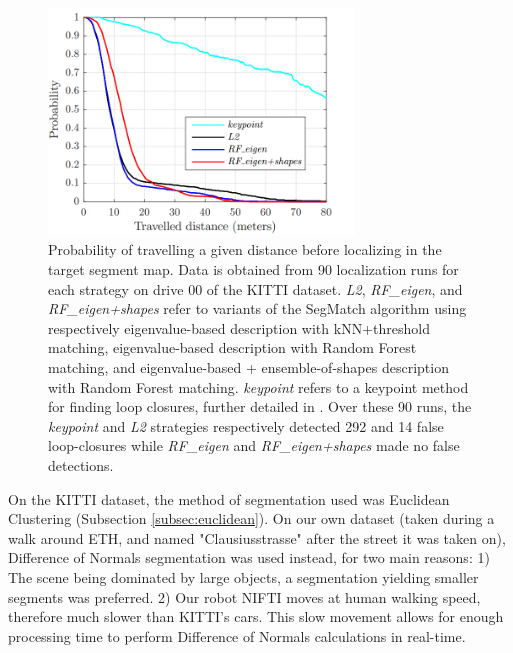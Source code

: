 \begin{figure}
  \centering
  \includegraphics[width=3.2in]{images/segmatch_vs_keypoints.png}
  \caption{Probability of travelling a given distance before localizing in the target segment map. Data is obtained from 90 localization runs for each strategy on drive 00 of the KITTI  dataset. \textit{L2}, \textit{RF\_eigen}, and \textit{RF\_eigen+shapes} refer to variants of the SegMatch algorithm using respectively eigenvalue-based description with kNN+threshold matching, eigenvalue-based description with Random Forest matching, and eigenvalue-based + ensemble-of-shapes description with Random Forest matching. \textit{keypoint} refers to a keypoint method for finding loop closures, further detailed in \citet{segmatch}. Over these 90 runs, the \textit{keypoint} and \textit{L2} strategies respectively detected 292 and 14 false loop-closures while \textit{RF\_eigen} and \textit{RF\_eigen+shapes} made no false detections.}
  \label{fig:segmatch-vs-keypoints}
\end{figure}

On the KITTI dataset, the method of segmentation used was Euclidean Clustering (Subsection \ref{subsec:euclidean}). On our own dataset (taken during a walk around ETH, and named "Clausiusstrasse" after the street it was taken on), Difference of Normals segmentation was used instead, for two main reasons: 1) The scene being dominated by large objects, a segmentation yielding smaller segments was preferred. 2) Our robot NIFTI moves at human walking speed, therefore much slower than KITTI's cars. This slow movement allows for enough processing time to perform Difference of Normals calculations in real-time.\\


